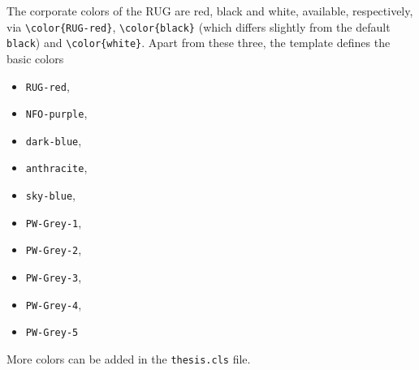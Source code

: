The corporate colors of the RUG are red, black and white, available, respectively, via \texttt{\textbackslash color\{{\color{RUG-red}RUG-red}\}}, \texttt{\textbackslash color\{{\color{black}black}\}} (which differs slightly from the default \texttt{black}) and \texttt{\textbackslash color\{white\}}. Apart from these three, the template defines the basic colors
\begin{itemize}
\itemsep 0pt
\parskip 0pt
\item\texttt{\color{RUG-red}RUG-red},
\item\texttt{\color{NFO-purple}NFO-purple},
\item\texttt{\color{dark-blue}dark-blue},
\item\texttt{\color{anthracite}anthracite},
\item\texttt{\color{sky-blue}sky-blue},
\item\texttt{\color{PW-Grey-1}PW-Grey-1},
\item\texttt{\color{PW-Grey-2}PW-Grey-2},
\item\texttt{\color{PW-Grey-3}PW-Grey-3},
\item\texttt{\color{PW-Grey-4}PW-Grey-4},
\item\texttt{\color{PW-Grey-5}PW-Grey-5}
\end{itemize}

More colors can be added in the \texttt{thesis.cls} file.

